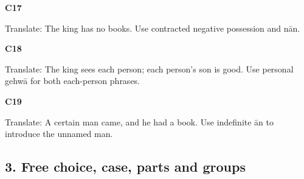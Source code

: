 \par\begin{minipage}{\linewidth}\raggedright
\textbf{C17}

Translate: The king has no books. Use contracted negative possession and nān.

\end{minipage}\par\addvspace{4pt}

\par\begin{minipage}{\linewidth}\raggedright
\textbf{C18}

Translate: The king sees each person; each person’s son is good. Use personal gehwā for both each-person phrases.

\end{minipage}\par\addvspace{4pt}

\par\begin{minipage}{\linewidth}\raggedright
\textbf{C19}

Translate: A certain man came, and he had a book. Use indefinite ān to introduce the unnamed man.

\end{minipage}\par\addvspace{4pt}

\subsection*{3. Free choice, case, parts and groups}

